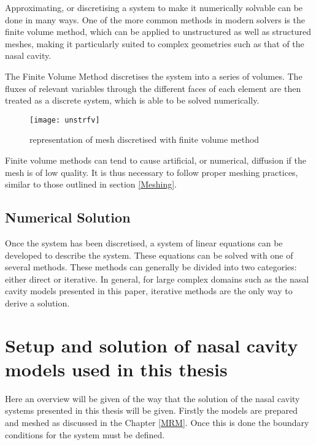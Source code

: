 Approximating, or discretising a system to make it numerically solvable can be done in many ways. One of the more common methods in modern solvers is the finite volume method, which can be applied to unstructured as well as structured meshes, making it particularly suited to complex geometries such as that of the nasal cavity.

The Finite Volume Method discretises the system into a series of volumes. The fluxes of relevant variables through the different faces of each element are then treated as a discrete system, which is able to be solved numerically.

\begin{figure}
  \texttt{[image: unstrfv]}
  \caption{representation of mesh discretised with finite volume method}
  \label{usfv}
\end{figure}

Finite volume methods can tend to cause artificial, or numerical, diffusion if the mesh is of low quality. It is thus necessary to follow proper meshing practices, similar to those outlined in section \ref{Meshing}.

\subsection{Numerical Solution}

Once the system has been discretised, a system of linear equations can be developed to describe the system. These equations can be solved with one of several methods. These methods can generally be divided into two categories: either direct or iterative. In general, for large complex domains such as the nasal cavity models presented in this paper, iterative methods are the only way to derive a solution.

\section{Setup and solution of nasal cavity models used in this thesis}
Here an overview will be given of the way that the solution of the nasal cavity systems presented in this thesis will be given. Firstly the models are prepared and meshed as discussed in the Chapter \ref{MRM}. Once this is done the boundary conditions for the system must be defined. 

